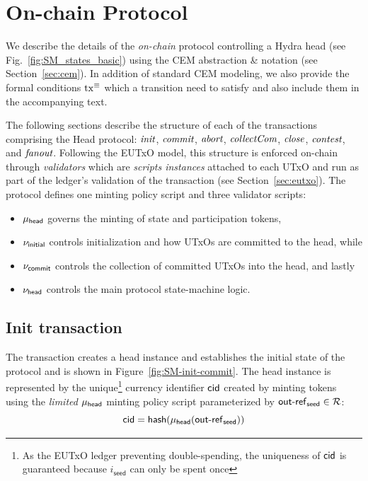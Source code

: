 \section{On-chain Protocol}\label{sec:on-chain}


We describe the details of the \emph{on-chain} protocol controlling a
Hydra head (see Fig.~\ref{fig:SM_states_basic}) using the CEM abstraction \&
notation (see Section~\ref{sec:cem}). In addition of standard CEM modeling, we
also provide the formal conditions $\mathrm{tx}^\equiv$ which a transition need to
satisfy and also include them in the accompanying text.

The following sections describe the structure of each of the transactions
comprising the Head protocol: $\textit{init}{}$, $\textit{commit}{}$, $\textit{abort}{}$,
$\textit{collectCom}{}$, $\textit{close}{}$, $\textit{contest}{}$, and $\textit{fanout}{}$. Following
the EUTxO model, this structure is enforced on-chain through \emph{validators}
which are \emph{scripts instances} attached to each UTxO and run as part of the
ledger's validation of the transaction (see Section~\ref{sec:eutxo}). The
protocol defines one minting policy script and three validator scripts:
\begin{itemize}
  \item $\mu_\mathsf{head}$ governs the minting of state and participation tokens,
  \item $\nu_{\mathsf{initial}}$ controls initialization and how UTxOs are committed to the head, while
  \item $\nu_{\mathsf{commit}}$ controls the collection of committed UTxOs into the head, and lastly
  \item $\nu_\mathsf{head}$ controls the main protocol state-machine logic.
\end{itemize}

\subsection{Init transaction}\label{sec:init-tx}

The \mtxInit{} transaction creates a head instance and establishes the initial
state of the protocol and is shown in Figure~\ref{fig:SM-init-commit}. The head
instance is represented by the unique\footnote{As the EUTxO ledger preventing
  double-spending, the uniqueness of $\mathsf{cid}$ is guaranteed because $i_{\mathsf{seed}}$ can
  only be spent once} currency identifier $\mathsf{cid}$ created by minting tokens using
the \emph{limited} $\mu_\mathsf{head}$ minting policy script parameterized by $\mathsf{out\textsf{-}{}ref}_{\mathsf{seed}} \in \mathcal{R}$:
\[
  \mathsf{cid} = \mathsf{hash}(\mu_\mathsf{head}(\mathsf{out\textsf{-}{}ref}_{\mathsf{seed}}))
\]


